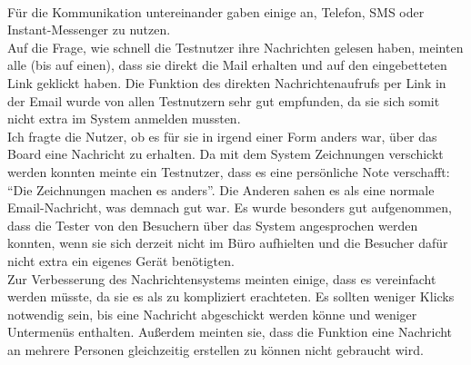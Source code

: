 \\
Für die Kommunikation untereinander gaben einige an, Telefon, SMS oder Instant-Messenger zu nutzen.
\\
Auf die Frage, wie schnell die Testnutzer ihre Nachrichten gelesen haben, meinten alle (bis auf einen), dass sie direkt die Mail erhalten und auf den eingebetteten Link geklickt haben.
Die Funktion des direkten Nachrichtenaufrufs per Link in der Email wurde von allen Testnutzern sehr gut empfunden, da sie sich somit nicht extra im System anmelden mussten.
\\
Ich fragte die Nutzer, ob es für sie in irgend einer Form anders war, über das Board eine Nachricht zu erhalten.
Da mit dem System Zeichnungen verschickt werden konnten meinte ein Testnutzer, dass es eine persönliche Note verschafft: ``Die Zeichnungen machen es anders''.
Die Anderen sahen es als eine normale Email-Nachricht, was demnach gut war.
Es wurde besonders gut aufgenommen, dass die Tester von den Besuchern über das System angesprochen werden konnten, wenn sie sich derzeit nicht im Büro aufhielten und die Besucher dafür nicht extra ein eigenes Gerät benötigten.
\\
Zur Verbesserung des Nachrichtensystems meinten einige, dass es vereinfacht werden müsste, da sie es als zu kompliziert erachteten.
Es sollten weniger Klicks notwendig sein, bis eine Nachricht abgeschickt werden könne und weniger Untermenüs enthalten.
Außerdem meinten sie, dass die Funktion eine Nachricht an mehrere Personen gleichzeitig erstellen zu können nicht gebraucht wird.





